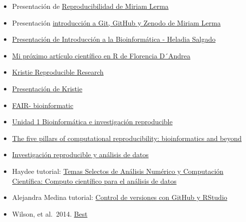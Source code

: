 \documentclass[
  spanish,
  12pt,
  letterpaper,
  DIV=11,
  numbers=noendperiod]{scrreprt}
\providecommand{\tightlist}{%
  \setlength{\itemsep}{0pt}\setlength{\parskip}{0pt}}
\begin{document}
\begin{itemize}
\tightlist
\item
  Presentación de
  \href{https://miriamll.github.io/teaching_R_Rmd/Repro\#1}{Reproducibilidad
  de Miriam Lerma}
\item
  Presentación
  \href{https://miriamll.github.io/teaching_R_Rmd/GitGithubZenodo\#1}{introducción
  a Git, GitHub y Zenodo de Miriam Lerma}
\item
  \href{https://lcg-cursos.github.io/material/introbioinfo/L2-buenas-practicas.html\#1}{Presentación
  de Introducción a la Bioinformática - Heladia Salgado}
\item
  \href{https://flor14.github.io/rladies-jujuy/presentacion.html?panelset=compendio&panelset1=bibliograf\%25C3\%25ADa\#3}{Mi
  próximo artículo científico en R de Florencia D´Andrea}
\item
  \href{https://github.com/WhitakerLab/ReproducibleResearch}{Kristie
  Reproducible Research}
\item
  \href{https://figshare.com/articles/journal_contribution/Showing_your_working_a_how_to_guide_to_reproducible_research/5443201/1?file=9410686}{Presentación
  de Kristie}
\item
  \href{https://ifb-elixirfr.github.io/IFB-FAIR-bioinfo-training/assets/pdf/Session2020/01_introduction.pdf}{FAIR-
  bioinformatic}
\item
  \href{https://github.com/AliciaMstt/BioinfInvRepro2016-II/blob/master/Unidad1/Unidad1_Bioinf_e_Investigaci\%C3\%B3n_Reproducible.md}{Unidad
  1 Bioinformática e investigación reproducible}
\item
  \href{https://academic.oup.com/bib/article/24/6/bbad375/7326135}{The
  five pillars of computational reproducibility: bioinformatics and
  beyond}
\item
  \href{https://open-science-training-handbook.github.io/Open-Science-Training-Handbook_ES/02OpenScienceBasics/04ReproducibleResearchAndDataAnalysis.html}{Investigación
  reproducible y análisis de datos}
\item
  Haydee tutorial:
  \href{https://haydeeperuyero.github.io/Computo_Cientifico/}{Temas
  Selectos de Análisis Numérico y Computación Científica: Computo
  científico para el análisis de datos}
\item
  Alejandra Medina tutorial:
  \href{https://comunidadbioinfo.github.io/cdsb2023/control-de-versiones-con-github-y-rstudio.html}{Control
  de versiones con GitHub y RStudio}
\item
  Wilson, et al.~2014.
  \href{https://journals.plos.org/plosbiology/article?id=10.1371/journal.pbio.1001745}{Best
}
\end{itemize}
\end{document}
